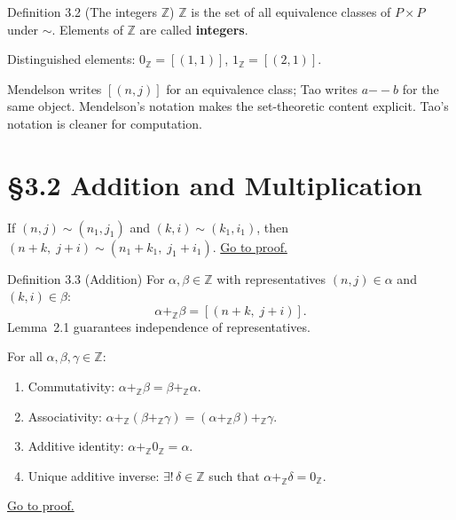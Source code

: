 \begin{corollarybox}{Definition 3.2 (The integers $\mathbb{Z}$)}
$\mathbb{Z}$ is the set of all equivalence classes of $P \times P$
under $\sim$.  Elements of $\mathbb{Z}$ are called \textbf{integers}.

Distinguished elements:
$0_{\mathbb{Z}} = [(1,1)]$, \quad $1_{\mathbb{Z}} = [(2,1)]$.
\end{corollarybox}

\begin{remark*}
Mendelson writes $[(n,j)]$ for an equivalence class;
Tao writes $a {-\!\!-} b$ for the same object.
Mendelson's notation makes the set-theoretic content explicit.
Tao's notation is cleaner for computation.
\end{remark*}

\section*{\S{}3.2 \quad Addition and Multiplication}

\begin{lemma}
\label{lem:men-add-welld}
If $(n,j) \sim (n_1,j_1)$ and $(k,i) \sim (k_1,i_1)$, then
$(n+k,\; j+i) \sim (n_1+k_1,\; j_1+i_1)$.
\hyperref[prf:men-add-welld]{Go to proof.}
\end{lemma}

\begin{corollarybox}{Definition 3.3 (Addition)}
For $\alpha, \beta \in \mathbb{Z}$ with representatives
$(n,j) \in \alpha$ and $(k,i) \in \beta$:
\[
\alpha +_{\mathbb{Z}} \beta = [(n+k,\; j+i)].
\]
Lemma~2.1 guarantees independence of representatives.
\end{corollarybox}

\begin{theorem}
\label{thm:men-add}
For all $\alpha, \beta, \gamma \in \mathbb{Z}$:
\begin{enumerate}
  \item[(i)] Commutativity: $\alpha +_{\mathbb{Z}} \beta
    = \beta +_{\mathbb{Z}} \alpha$.
  \item[(ii)] Associativity: $\alpha +_{\mathbb{Z}}
    (\beta +_{\mathbb{Z}} \gamma)
    = (\alpha +_{\mathbb{Z}} \beta) +_{\mathbb{Z}} \gamma$.
  \item[(iii)] Additive identity: $\alpha +_{\mathbb{Z}} 0_{\mathbb{Z}}
    = \alpha$.
  \item[(iv)] Unique additive inverse: $\exists!\,\delta \in \mathbb{Z}$
    such that $\alpha +_{\mathbb{Z}} \delta = 0_{\mathbb{Z}}$.
\end{enumerate}
\hyperref[prf:men-add]{Go to proof.}
\end{theorem}

